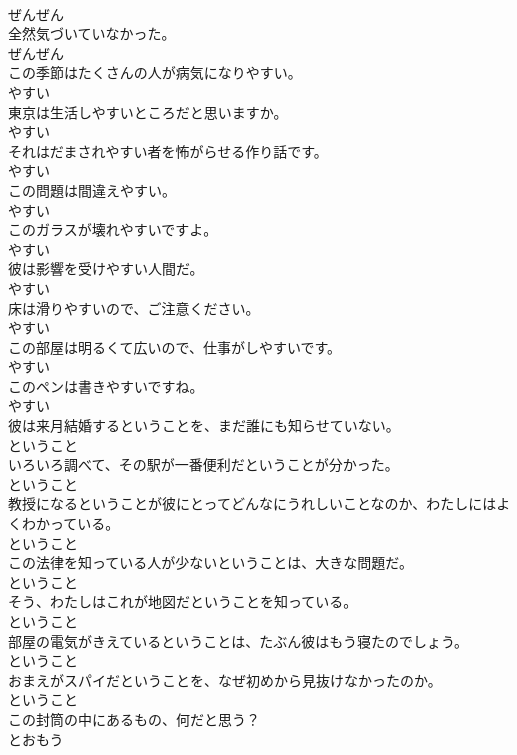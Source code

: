 \documentclass[8pt]{extreport}
\begin{document}
\begin{CJK}{UTF8}{min}
\\	ぜんぜん	
\\	全然気づいていなかった。	
\\	ぜんぜん	
\\	この季節はたくさんの人が病気になりやすい。	
\\	やすい	
\\	東京は生活しやすいところだと思いますか。	
\\	やすい	
\\	それはだまされやすい者を怖がらせる作り話です。	
\\	やすい	
\\	この問題は間違えやすい。	
\\	やすい	
\\	このガラスが壊れやすいですよ。	
\\	やすい	
\\	彼は影響を受けやすい人間だ。	
\\	やすい	
\\	床は滑りやすいので、ご注意ください。	
\\	やすい	
\\	この部屋は明るくて広いので、仕事がしやすいです。	
\\	やすい	
\\	このペンは書きやすいですね。	
\\	やすい	
\\	彼は来月結婚するということを、まだ誰にも知らせていない。	
\\	ということ	
\\	いろいろ調べて、その駅が一番便利だということが分かった。	
\\	ということ	
\\	教授になるということが彼にとってどんなにうれしいことなのか、わたしにはよくわかっている。	
\\	ということ	
\\	この法律を知っている人が少ないということは、大きな問題だ。	
\\	ということ	
\\	そう、わたしはこれが地図だということを知っている。	
\\	ということ	
\\	部屋の電気がきえているということは、たぶん彼はもう寝たのでしょう。	
\\	ということ	
\\	おまえがスパイだということを、なぜ初めから見抜けなかったのか。	
\\	ということ	
\\	この封筒の中にあるもの、何だと思う？	
\\	とおもう	

\end{CJK}
\end{document}
